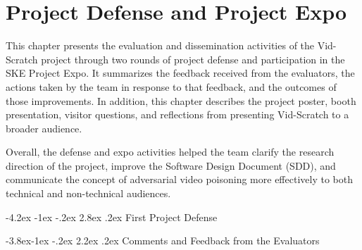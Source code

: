 \raggedbottom

\makeatletter
\renewcommand\section{\@startsection {section}{1}{\z@}%
                                   {-4.2ex \@plus -1ex \@minus -.2ex}%
                                   {2.8ex \@plus.2ex}%
                                   {\normalfont\moderate\bfseries}}
\renewcommand\subsection{\@startsection{subsection}{2}{\z@}%
                                     {-3.8ex\@plus -1ex \@minus -.2ex}%
                                     {2.2ex \@plus .2ex}%
                                     {\normalfont\normalsize\bfseries\leftskip 40pt}}
\makeatother

\chapter{Project Defense and Project Expo}
\label{chap:project-defense-expo}

This chapter presents the evaluation and dissemination activities of
the Vid-Scratch project through two rounds of project defense and
participation in the SKE Project Expo. It summarizes the feedback
received from the evaluators, the actions taken by the team in response
to that feedback, and the outcomes of those improvements. In addition,
this chapter describes the project poster, booth presentation, visitor
questions, and reflections from presenting Vid-Scratch to a broader
audience.

Overall, the defense and expo activities helped the team clarify the
research direction of the project, improve the Software Design Document
(SDD), and communicate the concept of adversarial video poisoning more
effectively to both technical and non-technical audiences.


\vspace{1.2\baselineskip}
\section{First Project Defense}
\label{section:first-defense}

\subsection{Comments and Feedback from the Evaluators}
\label{subsection:first-defense-feedback}

